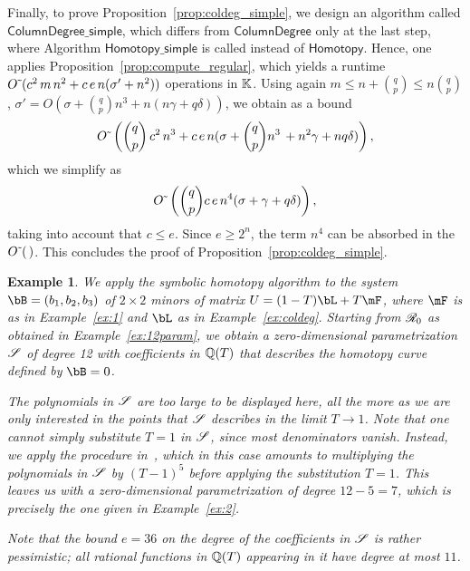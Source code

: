 \documentclass[12pt]{article}
\newtheorem{example}[definition]{Example}
\begin{document}
Finally, to prove Proposition~\ref{prop:coldeg_simple}, we design an
algorithm called $\mathsf{ColumnDegree\_simple}$, which differs from
$\mathsf{ColumnDegree}$ only at the last step, where Algorithm
$\mathsf{Homotopy\_simple}$ is called instead of $\mathsf{Homotopy}$.
Hence, one applies Proposition~\ref{prop:compute_regular}, which yields a
runtime ${O}{\,\tilde{ }\,}(c^2\,m \,n^2  + c\,e\,n (\sigma'+n^2) )$ operations
in $\mathbb{K}$. Using again $m \leq n+ \binom{q}{p}\leq n\binom{q}{p}$,
$\sigma'=O(\sigma + {q \choose p} n^3 +n(n\gamma+q\delta))$, we
obtain as a bound
\[
  {O}{\,\tilde{ }\,}\left (
    {q \choose p}\, c^2\,n^3 +  c\, e\,n (\sigma+ {q \choose p}n^3 \, +n^2\gamma +nq \delta)
  \right ),
\]
which we simplify as
\[
 {O}{\,\tilde{ }\,}\left (   {q \choose p}c\, e\,n^4 (\sigma+\gamma+q\delta) \right ),
\]
taking into account that $c \le e$.
Since $e \ge 2^n$, the term $n^4$ can be absorbed in 
the ${O}{\,\tilde{ }\,}(\, )$.
This concludes the proof of Proposition~\ref{prop:coldeg_simple}. 

\begin{example}
  We apply the symbolic homotopy algorithm to the system
  $\bB=(b_1,b_2,b_3)$ of $2\times 2$ minors of matrix $\mU = (1-T) \bL
  + T\mF$, where $\mF$ is as in Example~\ref{ex:1} and $\bL$ as in
  Example~\ref{ex:coldeg}.  Starting from $\mathscr{R}_0$ as obtained in
  Example~\ref{ex:12param}, we obtain a zero-dimensional
  parametrization $\mathscr{S}$ of degree 12 with coefficients in $\mathbb{Q}(T)$
  that describes the homotopy curve defined by $\bB=0$.

  The polynomials in $\mathscr{S}$ are too large to be displayed here, all
  the more as we are only interested in the points that $\mathscr{S}$
  describes in the limit $T \to 1$. Note that one cannot simply
  substitute $T=1$ in $\mathscr{S}$, since most denominators vanish. Instead,
  we apply the procedure in~\cite{RRS}, which in this case amounts to
  multiplying the polynomials in $\mathscr{S}$ by $(T-1)^5$ before applying
  the substitution $T = 1$. This leaves us with a
  zero-dimensional parametrization of degree $12-5=7$, which is
  precisely the one given in Example~\ref{ex:2}.

  Note that the bound $e=36$ on the degree of the coefficients in
  $\mathscr{S}$ is rather pessimistic; all rational functions in $\mathbb{Q}(T)$
  appearing in it have degree at most $11$.
\end{example}


\end{document}
